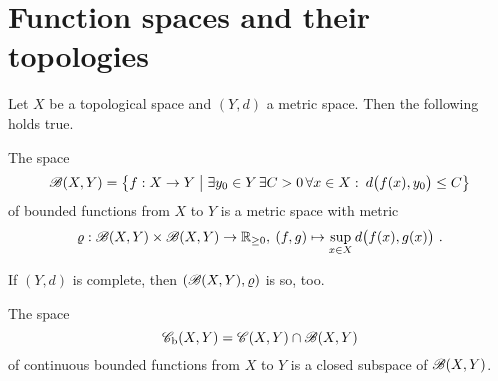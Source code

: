 %
\section{Function spaces and their topologies}
\label{sec:function-spaces-topologies}

\begin{proposition}
  \label{thm:metric-structure-space-bounded-maps}
  Let $X$ be a topological space and $(Y,d)$ a metric space.
  Then the following holds true.
  \begin{romanlist}
  \item\label{ite:metric-space-bounded-maps}
  The space
  \[
    \mathscr{B} (X,Y) = \big\{ f : X \to Y \bigm\vert
    \exists y_0\in Y \, \exists C >0 \, \forall x\in X : \:  d\big(f(x),y_0\big) \leq C\big\}
  \]
  of bounded functions from $X$ to $Y$ is a metric space with metric
  \[
    \varrho : \mathscr{B} (X,Y) \times \mathscr{B} (X,Y) \to \mathbb{R}_{\geq 0} , \: (f,g) \mapsto
     \sup_{x\in X} d\big( f(x),g(x)\big)   \ .
  \]
  \item
  \label{ite:completeness-space-bounded-maps-range-complete-metric-space}
    If $(Y,d)$ is complete, then $(\mathscr{B} (X,Y),\varrho)$ is so, too.
  \item
  \label{ite:closedness-bounded-continuous-functions-space-bounded-functions}
    The space
    \[
      \mathscr{C}_\textup{b} (X,Y) = \mathscr{C} (X,Y) \cap \mathscr{B} (X,Y) 
    \]
    of continuous bounded functions from $X$ to $Y$ is a closed subspace of $\mathscr{B} (X,Y)$. 
  \end{romanlist}
\end{proposition}
